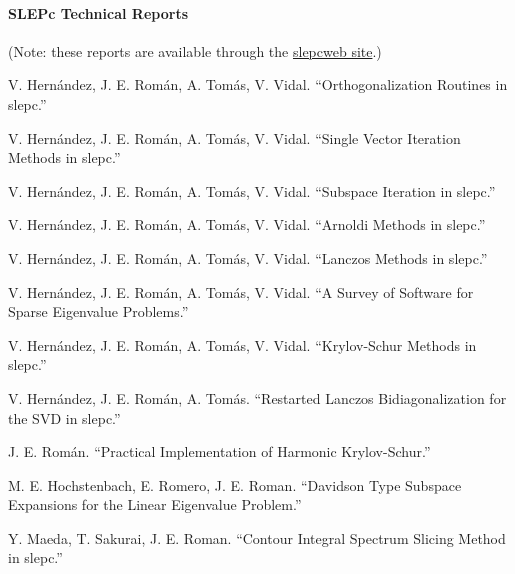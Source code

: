 \documentclass[titlepage,10pt,a4paper]{book}
\newcommand{\packnoi}[1]{{\sc #1}\xspace}
\newcommand{\slepc}{\texorpdfstring{\packnoi{slep\rm c}}{{SLEPc}}}
\begin{document}
{\bibfont
\paragraph{SLEPc Technical Reports}
\hypertarget{str}{}
(Note: these reports are available through the \href{http://slepc.upv.es}{\slepc web site}.)
\begin{list}{}{\setlength{\labelwidth}{3cm}\setlength{\leftmargin}{12.5mm}}
\item[\textrm{\sffamily[STR-1]}] V. Hern\'andez, J. E. Rom\'an, A. Tom\'as, V. Vidal. ``Orthogonalization Routines in \slepc.''
\item[\textrm{\sffamily[STR-2]}] V. Hern\'andez, J. E. Rom\'an, A. Tom\'as, V. Vidal. ``Single Vector Iteration Methods in \slepc.''
\item[\textrm{\sffamily[STR-3]}] V. Hern\'andez, J. E. Rom\'an, A. Tom\'as, V. Vidal. ``Subspace Iteration in \slepc.''
\item[\textrm{\sffamily[STR-4]}] V. Hern\'andez, J. E. Rom\'an, A. Tom\'as, V. Vidal. ``Arnoldi Methods in \slepc.''
\item[\textrm{\sffamily[STR-5]}] V. Hern\'andez, J. E. Rom\'an, A. Tom\'as, V. Vidal. ``Lanczos Methods in \slepc.''
\item[\textrm{\sffamily[STR-6]}] V. Hern\'andez, J. E. Rom\'an, A. Tom\'as, V. Vidal. ``A Survey of Software for Sparse Eigenvalue Problems.''
\item[\textrm{\sffamily[STR-7]}] V. Hern\'andez, J. E. Rom\'an, A. Tom\'as, V. Vidal. ``Krylov-Schur Methods in \slepc.''
\item[\textrm{\sffamily[STR-8]}] V. Hern\'andez, J. E. Rom\'an, A. Tom\'as. ``Restarted Lanczos Bidiagonalization for the SVD in \slepc.''
\item[\textrm{\sffamily[STR-9]}] J. E. Rom\'an. ``Practical Implementation of Harmonic Krylov-Schur.''
\item[\textrm{\sffamily[STR-10]}] M. E. Hochstenbach, E. Romero, J. E. Roman. ``Davidson Type Subspace Expansions for the Linear Eigenvalue Problem.''
\item[\textrm{\sffamily[STR-11]}] Y. Maeda, T. Sakurai, J. E. Roman. ``Contour Integral Spectrum Slicing Method in \slepc.''
\end{list}
}

\cleardoublepage
\fancyhead{}
\printindex
\cleardoublepage
\end{document}
